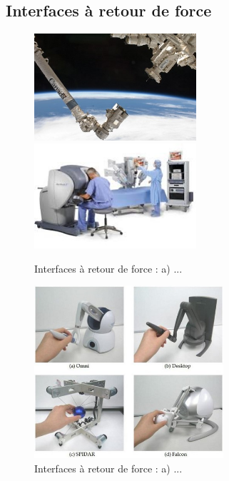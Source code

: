 \subsection{Interfaces à retour de force}
\begin{figure}[!h]
	\centering
	\includegraphics[width=6cm]{1_Bible/Photos/Apparatus/bras_ca.jpg}\hspace{2cm}
	\includegraphics[width=6cm]{1_Bible/Photos/Apparatus/da_vinci.jpg}
	\caption{Interfaces à retour de force : a) ... }\label{int_retourf_1}
\end{figure}
\begin{figure}[!h]
	\centering
	\includegraphics[width=7cm]{1_Bible/Photos/Apparatus/falcon.jpg}
	\caption{Interfaces à retour de force : a) ... }\label{int_retourf_2}
\end{figure}	
